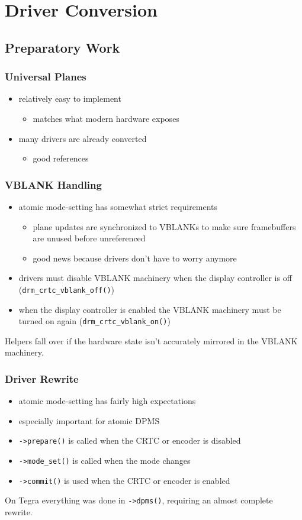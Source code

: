 \documentclass[t]{beamer}
\begin{document}
\section{Driver Conversion}

\subsection{Preparatory Work}

\begin{frame}
	\frametitle{Universal Planes}
	\begin{itemize}
		\item relatively easy to implement
			\begin{itemize}
				\item matches what modern hardware exposes
			\end{itemize}
		\item many drivers are already converted
			\begin{itemize}
				\item good references
			\end{itemize}
	\end{itemize}
\end{frame}

\begin{frame}
	\frametitle{VBLANK Handling}
	\begin{itemize}
		\item atomic mode-setting has somewhat strict requirements
			\begin{itemize}
				\item plane updates are synchronized to VBLANKs to make sure
					framebuffers are unused before unreferenced
				\item good news because drivers don't have to worry anymore
			\end{itemize}
		\item drivers must disable VBLANK machinery when the display
			controller is off ({\tt drm\_crtc\_vblank\_off()})
		\item when the display controller is enabled the VBLANK machinery must
			be turned on again ({\tt drm\_crtc\_vblank\_on()})
	\end{itemize}
	Helpers fall over if the hardware state isn't accurately mirrored in the
	VBLANK machinery.
\end{frame}

\begin{frame}
	\frametitle{Driver Rewrite}
	\begin{itemize}
		\item atomic mode-setting has fairly high expectations
		\item especially important for atomic DPMS
		\item {\tt ->prepare()} is called when the CRTC or encoder is disabled
		\item {\tt ->mode\_set()} is called when the mode changes
		\item {\tt ->commit()} is used when the CRTC or encoder is enabled
	\end{itemize}
	On Tegra everything was done in {\tt ->dpms()}, requiring an almost
	complete rewrite.
\end{frame}
\end{document}
